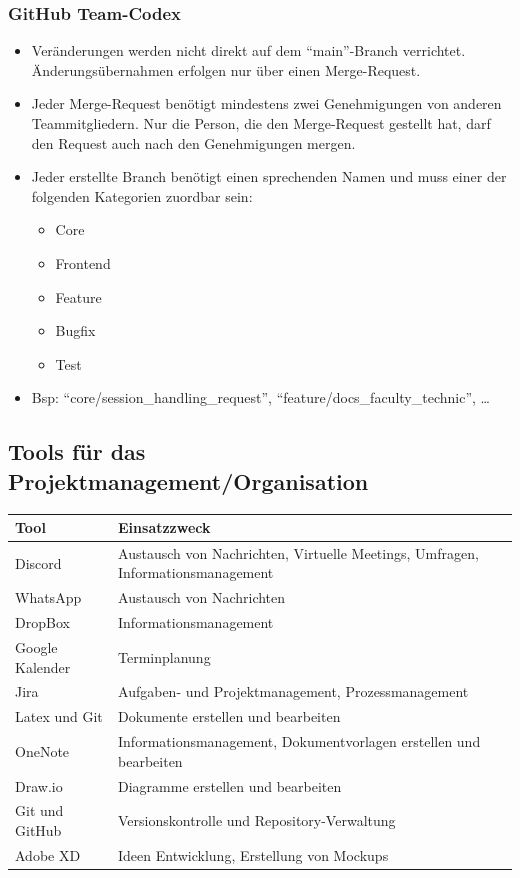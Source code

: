 \documentclass[a4paper,11pt]{scrartcl}
\begin{document}
\subsubsection{GitHub Team-Codex }
\begin{itemize}
\item Veränderungen werden nicht direkt auf dem "`main"'-Branch verrichtet. Änderungsübernahmen erfolgen nur über einen Merge-Request.  
\item Jeder Merge-Request benötigt mindestens zwei Genehmigungen von anderen Teammitgliedern. Nur die Person, die den Merge-Request gestellt hat, darf den Request auch nach den Genehmigungen mergen. 
\item Jeder erstellte Branch benötigt einen sprechenden Namen und muss einer der folgenden Kategorien zuordbar sein: 
\begin{itemize}
\item Core
\item Frontend 
\item Feature 
\item Bugfix 
\item Test  
\end{itemize}
\item[] Bsp: "`core/session\_handling\_request"', "`feature/docs\_faculty\_technic"', …
\end{itemize}

\subsection{Tools für das Projektmanagement/Organisation}

\begin{table}[H]
\begin{tabular}{|p{4.5cm}|p{8cm}|}
\hline
\textbf{Tool} &\textbf{Einsatzzweck} \\ \hline
Discord &  Austausch von Nachrichten, Virtuelle Meetings, Umfragen, Informationsmanagement\\ \hline
WhatsApp &  Austausch von Nachrichten\\ \hline
DropBox & Informationsmanagement \\ \hline
Google Kalender & Terminplanung   \\ \hline
Jira &  Aufgaben- und Projektmanagement, Prozessmanagement \\ \hline
Latex und Git &  Dokumente erstellen und bearbeiten \\ \hline
OneNote &  Informationsmanagement, Dokumentvorlagen erstellen und bearbeiten \\ \hline
Draw.io &  Diagramme erstellen und bearbeiten \\ \hline
Git und GitHub & Versionskontrolle und Repository-Verwaltung \\ \hline
Adobe XD & Ideen Entwicklung, Erstellung von Mockups \\ \hline
\end{tabular}
\end{table}
\end{document}
